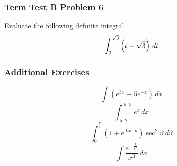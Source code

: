 \documentclass[xcolor=dvipsnames]{beamer}
\newcommand{\sheq}{3}
\begin{document}
\begin{frame}
  \frametitle{Term Test B Problem 6}
  Evaluate the following definite integral.
\begin{equation}
  \label{eq:gairooth}
  \int_{0}^{\sqrt{\sheq}}\left(t-\sqrt{\sheq}\right)\,dt\notag
\end{equation}
\end{frame}

\begin{frame}
  \frametitle{Additional Exercises}
  \begin{equation}
    \label{eq:esahtoip}
    \int\left(e^{3x}+5e^{-x}\right)\,dx
  \end{equation}
  \begin{equation}
    \label{eq:joopiemo}
    \int_{\ln{}2}^{\ln{}3}e^{x}\,dx
  \end{equation}
  \begin{equation}
    \label{eq:jelaenah}
    \int_{0}^{\frac{\pi}{4}}\left(1+e^{\tan{}\vartheta}\right)\sec^{2}\vartheta\,d\vartheta
  \end{equation}
  \begin{equation}
    \label{eq:pohchugh}
    \int\frac{e^{-\frac{1}{x^{2}}}}{x^{3}}\,dx
  \end{equation}
\end{frame}
\end{document}
